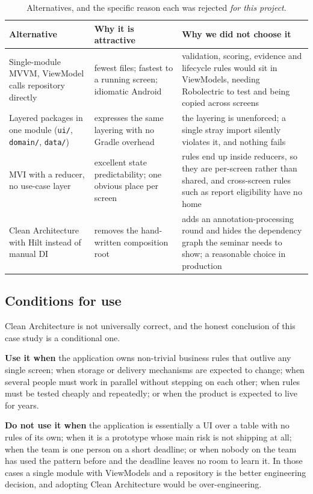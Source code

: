 \documentclass[11pt,a4paper]{article}
\begin{document}
\begin{table}[H]
\centering
\small
\begin{tabularx}{\linewidth}{@{}p{4.1cm} X X@{}}
\toprule
\textbf{Alternative} & \textbf{Why it is attractive} & \textbf{Why we did not choose it} \\
\midrule
Single-module MVVM, ViewModel calls repository directly
& fewest files; fastest to a running screen; idiomatic Android
& validation, scoring, evidence and lifecycle rules would sit in ViewModels, needing Robolectric to test and being copied across screens \\
\addlinespace
Layered packages in one module (\texttt{ui/}, \texttt{domain/}, \texttt{data/})
& expresses the same layering with no Gradle overhead
& the layering is unenforced; a single stray import silently violates it, and nothing fails \\
\addlinespace
MVI with a reducer, no use-case layer
& excellent state predictability; one obvious place per screen
& rules end up inside reducers, so they are per-screen rather than shared, and cross-screen rules such as report eligibility have no home \\
\addlinespace
Clean Architecture with Hilt instead of manual DI
& removes the hand-written composition root
& adds an annotation-processing round and hides the dependency graph the seminar needs to show; a reasonable choice in production \\
\bottomrule
\end{tabularx}
\caption{Alternatives, and the specific reason each was rejected \emph{for this project}.}
\end{table}

\subsection{Conditions for use}

Clean Architecture is not universally correct, and the honest conclusion of this
case study is a conditional one.

\textbf{Use it when} the application owns non-trivial business rules that outlive
any single screen; when storage or delivery mechanisms are expected to change;
when several people must work in parallel without stepping on each other; when
rules must be tested cheaply and repeatedly; or when the product is expected to
live for years.

\textbf{Do not use it when} the application is essentially a UI over a table with
no rules of its own; when it is a prototype whose main risk is not shipping at
all; when the team is one person on a short deadline; or when nobody on the team
has used the pattern before and the deadline leaves no room to learn it. In those
cases a single module with ViewModels and a repository is the better engineering
decision, and adopting Clean Architecture would be over-engineering.
\end{document}
